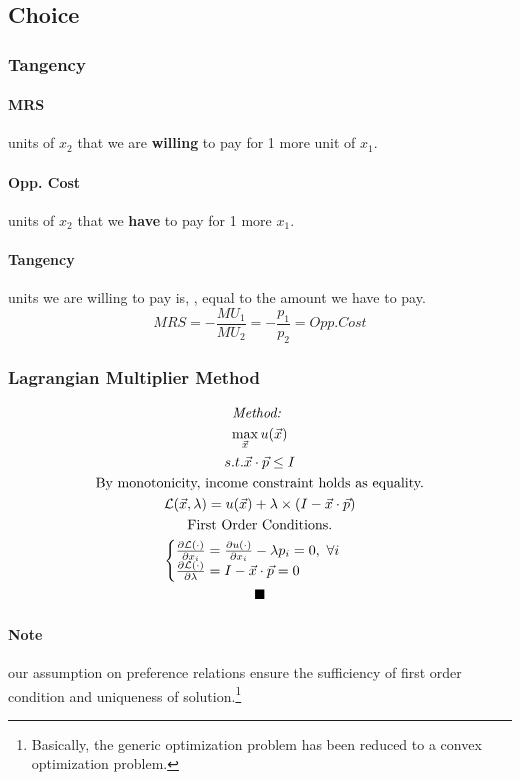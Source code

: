 \documentclass{article}
\newcommand{\mc}[1]{\mathcal{#1}}
\begin{document}
		\subsection{Choice}
			\subsubsection{Tangency}
				\paragraph{MRS} units of $x_2$ that we are \textbf{willing} to pay for 1 more unit of $x_1$.
				\paragraph{Opp. Cost} units of $x_2$ that we \textbf{have} to pay for 1 more $x_1$.
				\paragraph{Tangency} units we are willing to pay is, , equal to the amount we have to pay.
				\[
					MRS =-\frac{MU_1}{MU_2} = -\frac{p_1}{p_2} = Opp. Cost
				\]
			\subsubsection{Lagrangian Multiplier Method}
				\begin{multline*}
					\emph{Method: }\\
					\max_{\vec{x}} u(\vec{x}) \\
					s.t. \vec{x}\cdot \vec{p} \leq I \\
					\tx{By monotonicity, income constraint holds as equality.} \\
					\mc{L}(\vec{x}, \lambda) = u(\vec{x}) + \lambda \times (I - \vec{x}\cdot \vec{p}) \\
					\tx{First Order Conditions.} \\
					\begin{cases}
						\pd{\mc{L}(\cdot)}{x_i} = \pd{u(\cdot)}{x_i} - \lambda p_i = 0,\ \forall i \\
						\pd{\mc{L}(\cdot)}{\lambda} = I - \vec{x}\cdot\vec{p} = 0 \\
					\end{cases} \\
					\blacksquare
				\end{multline*}
				\paragraph{Note} our assumption on preference relations ensure the sufficiency of first order condition and uniqueness of solution.\footnote{Basically, the generic optimization problem has been reduced to a convex optimization problem.}
\end{document}
